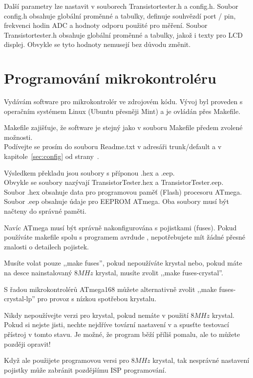 Další parametry lze nastavit v souborech Transistortester.h a config.h.
Soubor config.h obsahuje globální proměnné a tabulky, definuje souhvězdí port / pin,
frekvenci hodin ADC a hodnoty odporu použité pro měření.
Soubor Transistortester.h obsahuje globální proměnné a tabulky, jakož i texty pro LCD displej.
Obvykle se tyto hodnoty nemusejí bez důvodu změnit.
\vspace*{-0.6cm}
\section{Programování mikrokontroléru}
\vspace*{-0.4cm}
Vydávám software pro mikrokontrolér ve zdrojovém kódu.
Vývoj byl proveden s operačním systémem Linux (Ubuntu přesněji Mint)
a je ovládán přes Makefile.

Makefile zajišťuje, že software je stejný jako v souboru Makefile
předem zvolené možnosti.\\
Podívejte se prosím do souboru Readme.txt
v adresáři trunk/default a v kapitole~\ref{sec:config} od strany~\pageref{sec:config}.

Výsledkem překladu jsou soubory s příponou .hex a .eep.\\
Obvykle se soubory nazývají TransistorTester.hex a TransistorTester.eep.\\
Soubor .hex obsahuje data pro programovou paměť (Flash) procesoru ATmega.
Soubor .eep obsahuje údaje pro EEPROM ATmega.
Oba soubory musí být načteny do správné paměti.

Navíc ATmega musí být správně nakonfigurována s pojistkami (fuses).
Pokud používáte makefile spolu s programem avrdude \cite{avrdude}, nepotřebujete mít
žádné přesné znalosti o detailech pojistek.

Musíte volat pouze ,,make fuses'', pokud nepoužíváte krystal nebo, pokud máte na desce nainstalovaný  \(8MHz\) krystal, musíte zvolit ,,make fuses-crystal''.

S řadou mikrokontrolérů ATmega168 můžete alternativně zvolit ,,make fuses-crystal-lp'' pro provoz s nízkou spotřebou krystalu.

Nikdy nepoužívejte verzi pro krystal, pokud nemáte v použití \(8MHz\) krystal.\\
Pokud si nejste jisti, nechte nejdříve tovární nastavení v  a spusťte testovací přístroj v tomto stavu.
Je možné, že program běží příliš pomalu, ale to můžete později opravit!

Když ale použijete programovou versi pro \(8MHz\) krystal, 
tak nesprávné nastavení pojistky může zabránit pozdějšímu ISP programování.
\vspace*{-0.4cm}
